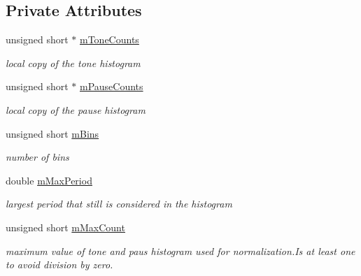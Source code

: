 \subsection*{Private Attributes}
\begin{DoxyCompactItemize}
\item 
\mbox{\label{classHistogramPanel_afded835e5e02c8216ab3353e0f4ac460}} 
unsigned short $\ast$ \hyperlink{classHistogramPanel_afded835e5e02c8216ab3353e0f4ac460}{m\+Tone\+Counts}
\begin{DoxyCompactList}\small\item\em local copy of the tone histogram \end{DoxyCompactList}\item 
\mbox{\label{classHistogramPanel_a5c3692f97de5cbab8325b3523f21650c}} 
unsigned short $\ast$ \hyperlink{classHistogramPanel_a5c3692f97de5cbab8325b3523f21650c}{m\+Pause\+Counts}
\begin{DoxyCompactList}\small\item\em local copy of the pause histogram \end{DoxyCompactList}\item 
\mbox{\label{classHistogramPanel_a56b8a27464d6455cfbae9ae56c5cbe94}} 
unsigned short \hyperlink{classHistogramPanel_a56b8a27464d6455cfbae9ae56c5cbe94}{m\+Bins}
\begin{DoxyCompactList}\small\item\em number of bins \end{DoxyCompactList}\item 
\mbox{\label{classHistogramPanel_a2f3140c84d15627c9df2f0cd9506233a}} 
double \hyperlink{classHistogramPanel_a2f3140c84d15627c9df2f0cd9506233a}{m\+Max\+Period}
\begin{DoxyCompactList}\small\item\em largest period that still is considered in the histogram \end{DoxyCompactList}\item 
\mbox{\label{classHistogramPanel_a96f1b45929d56ead29f52d738fbfb107}} 
unsigned short \hyperlink{classHistogramPanel_a96f1b45929d56ead29f52d738fbfb107}{m\+Max\+Count}
\begin{DoxyCompactList}\small\item\em maximum value of tone and paus histogram used for normalization.\+Is at least one to avoid division by zero. \end{DoxyCompactList}\end{DoxyCompactItemize}


